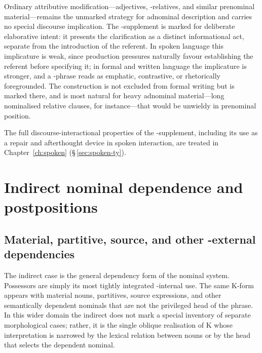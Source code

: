 Ordinary attributive modification---adjectives, -relatives, and
similar prenominal material---remains the unmarked strategy for adnominal
description and carries no special discourse implication. The
-supplement is marked for deliberate elaborative intent: it presents the
clarification as a distinct informational act, separate from the introduction of
the referent. In spoken language this implicature is weak, since production
pressures naturally favour establishing the referent before specifying it; in
formal and written language the implicature is stronger, and a -phrase
reads as emphatic, contrastive, or rhetorically foregrounded. The construction
is not excluded from formal writing but is marked there, and is most natural for
heavy adnominal material---long nominalised relative clauses, for
instance---that would be unwieldy in prenominal position.

The full discourse-interactional properties of the -supplement,
including its use as a repair and afterthought device in spoken interaction, are
treated in Chapter~\ref{ch:spoken} (\S\,\ref{sec:spoken-ty}).

\FloatBarrier

\section{Indirect nominal dependence and postpositions}
\label{sec:nm-ext}

\subsection{Material, partitive, source, and other -external
  dependencies}
\label{sec:nm-ext-indirect}

The indirect case is the general dependency form of the nominal
system. Possessors are simply its most tightly integrated -internal
use. The same K-form appears with material nouns, partitives, source
expressions, and other semantically dependent nominals that are not the
privileged head of the phrase. In this wider domain the indirect does
not mark a special inventory of separate morphological cases; rather, it
is the single oblique realisation of K whose interpretation is narrowed
by the lexical relation between nouns or by the head that selects the
dependent nominal.

\pex
\a {} 
\a {} 
\a {} 
\a {} 
\xe

